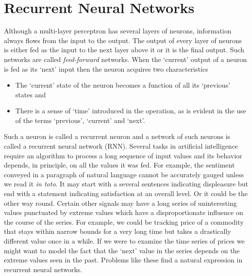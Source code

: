 \documentclass[11pt]{article}
\numberwithin{equation}{section}
\begin{document}
\section{Recurrent Neural Networks}\label{s4}
Although a multi-layer perceptron has several layers of neurons, information
always flows from the input to the output. The output of every layer of 
neurons is either fed as the input to the next layer above it or it is the
final output. Such networks are called \emph{feed-forward} networks. When the
`current' output of a neuron is fed as its `next' input then the neuron 
acquires two characteristics
\begin{itemize}
\item The `current' state of the neuron becomes a function of all its `previous'
states and 
\item There is a sense of `time' introduced in the operation, as is evident
in the use of the terms `previous', `current' and `next'.
\end{itemize}
Such a neuron is called a recurrent neuron and a network of such neurons is
called a recurrent neural network (RNN). Several tasks in artificial 
intelligence require an algorithm to process a long sequence of input values
and its behavior depends, in principle, on all the values it was fed. For
example, the sentiment conveyed in a paragraph of natural language cannot be
accurately gauged unless we read it \emph{in toto}. It may start with a several
sentences indicating displeasure but end with a statement indicating 
satisfaction at an overall level. Or it could be the other way round. Certain
other signals may have a long series of uninteresting values punctuated by
extreme values which have a disproportionate influence on the course of the 
series. For example, we could be tracking price of a commodity that stays
within narrow bounds for a very long time but takes a drastically different
value once in a while. If we were to examine the time series of prices we
might want to model the fact that the `next' value in the series depends on
the extreme values seen in the past. Problems like these find a natural
expression in recurrent neural networks.
\end{document}
